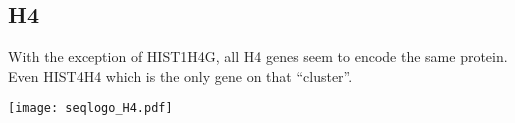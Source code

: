   \subsection{H4}
    With the exception of HIST1H4G, all H4 genes seem to encode the same protein. Even HIST4H4 which is the
    only gene on that ``cluster''.
    \begin{TableAndFigure*}
      \label{tab:H4-consensus}
      

      \texttt{[image: seqlogo\_H4.pdf]}
      \label{fig:H4-weblogo}
    \end{TableAndFigure*}

